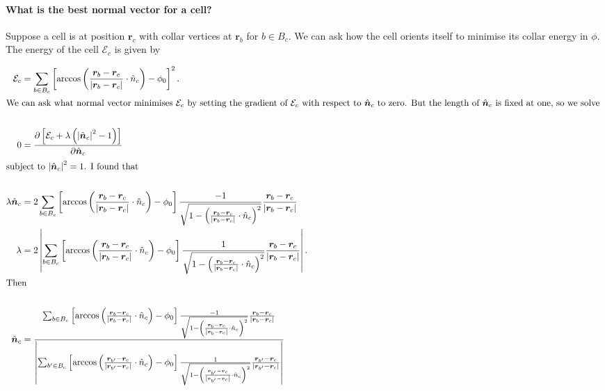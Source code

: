\documentclass[draft]{article}
\newcommand{\e}{\mathcal{E}}
\begin{document}
\paragraph{What is the best normal vector for a cell?}

Suppose a cell is at position $\bm{r}_c$ with collar vertices at $\bm{r}_b$ for $b \in B_c$. We can ask how the cell orients itself to minimise its collar energy in $\phi$. The energy of the cell $\e_c$ is given by 

\begin{align*}
    \e_c &= \sum_{b\in B_c} \left[ \arccos\left(\frac{\bm{r}_b - \bm{r}_c}{\left|\bm{r}_b - \bm{r}_c\right|} \cdot \hat{n}_c \right) - \phi_0 \right]^2. \\
    \intertext{We can ask what normal vector minimises $\e_c$ by setting the gradient of $\e_c$ with respect to $\hat{\bm{n}}_c$ to zero. But the length of $\hat{\bm{n}}_c$ is fixed at one, so we solve } \\
    0 &= \frac{\partial \left[ \e_c + \lambda\left( \left| \hat{\bm{n}}_c\right|^2 - 1\right) \right] }{\partial \hat{\bm{n}}_c} \\
    \intertext{subject to $\left| \hat{\bm{n}}_c\right|^2 = 1$. I found that } \\
    \lambda \hat{\bm{n}}_c &= 2 \sum_{b \in B_c} \left[ \arccos\left(\frac{\bm{r}_b - \bm{r}_c}{\left|\bm{r}_b - \bm{r}_c\right|} \cdot \hat{n}_c \right) - \phi_0 \right] \frac{-1}{\sqrt{1 - \left(\frac{\bm{r}_b - \bm{r}_c}{\left|\bm{r}_b - \bm{r}_c\right|} \cdot \hat{n}_c \right)^2 }}\frac{\bm{r}_b - \bm{r}_c}{\left|\bm{r}_b - \bm{r}_c\right|}
    \\
    \lambda &= 2 \left| \sum_{b\in B_c} \left[\arccos\left(\frac{\bm{r}_b - \bm{r}_c}{\left|\bm{r}_b - \bm{r}_c\right|} \cdot \hat{n}_c \right) - \phi_0 \right]
    \frac{1}{\sqrt{1 - \left(\frac{\bm{r}_b - \bm{r}_c}{\left|\bm{r}_b - \bm{r}_c\right|} \cdot \hat{n}_c \right)^2 }}
    \frac{\bm{r}_b - \bm{r}_c}{\left|\bm{r}_b - \bm{r}_c\right|} \right|. \\
    \intertext{Then } \\
    \hat{\bm{n}}_c &= \frac{\sum_{b \in B_c} \left[ \arccos\left(\frac{\bm{r}_b - \bm{r}_c}{\left|\bm{r}_b - \bm{r}_c\right|} \cdot \hat{n}_c \right) - \phi_0 \right] \frac{-1}{\sqrt{1 - \left(\frac{\bm{r}_b - \bm{r}_c}{\left|\bm{r}_b - \bm{r}_c\right|} \cdot \hat{n}_c \right)^2 }}\frac{\bm{r}_b - \bm{r}_c}{\left|\bm{r}_b - \bm{r}_c\right|}}{\left| \sum_{b'\in B_c} \left[\arccos\left(\frac{\bm{r}_{b'} - \bm{r}_c}{\left|\bm{r}_{b'} - \bm{r}_c\right|} \cdot \hat{n}_c \right) - \phi_0 \right]
    \frac{1}{\sqrt{1 - \left(\frac{\bm{r}_{b'} - \bm{r}_c}{\left|\bm{r}_{b'} - \bm{r}_c\right|} \cdot \hat{n}_c \right)^2 }}
    \frac{\bm{r}_{b'} - \bm{r}_c}{\left|\bm{r}_{b'} - \bm{r}_c\right|} \right|}
\end{align*}
\end{document}
